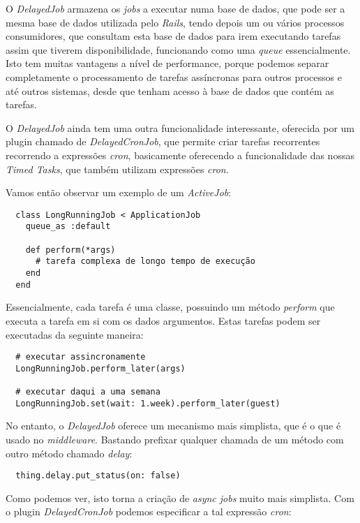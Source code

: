 O \textit{DelayedJob} armazena os \textit{jobs} a executar numa base de dados, que pode ser a mesma base de dados utilizada pelo \textit{Rails}, tendo depois um ou vários processos consumidores, que consultam esta base de dados para irem executando tarefas assim que tiverem disponibilidade, funcionando como uma \textit{queue} essencialmente. Isto tem muitas vantagens a nível de performance, porque podemos separar completamente o processamento de tarefas assíncronas para outros processos e até outros sistemas, desde que tenham acesso à base de dados que contém as tarefas.

O \textit{DelayedJob} ainda tem uma outra funcionalidade interessante, oferecida por um plugin chamado de \textit{DelayedCronJob}, que permite criar tarefas recorrentes recorrendo a expressões \textit{cron}, basicamente oferecendo a funcionalidade das nossas \textit{Timed Tasks}, que também utilizam expressões \textit{cron}.

Vamos então observar um exemplo de um \textit{ActiveJob}:

\begin{verbatim}
  class LongRunningJob < ApplicationJob
    queue_as :default
 
    def perform(*args)
      # tarefa complexa de longo tempo de execução
    end
  end
\end{verbatim}

Essencialmente, cada tarefa é uma classe, possuindo um método \textit{perform} que executa a tarefa em si com os dados argumentos. Estas tarefas podem ser executadas da seguinte maneira:

\begin{verbatim}
  # executar assincronamente
  LongRunningJob.perform_later(args)
  
  # executar daqui a uma semana
  LongRunningJob.set(wait: 1.week).perform_later(guest)
\end{verbatim}

No entanto, o \textit{DelayedJob} oferece um mecanismo mais simplista, que é o que é usado no \textit{middleware}. Bastando prefixar qualquer chamada de um método com outro método chamado \textit{delay}:

\begin{verbatim}
  thing.delay.put_status(on: false)
\end{verbatim}

Como podemos ver, isto torna a criação de \textit{async jobs} muito mais simplista. Com o plugin \textit{DelayedCronJob} podemos especificar a tal expressão \textit{cron}:

